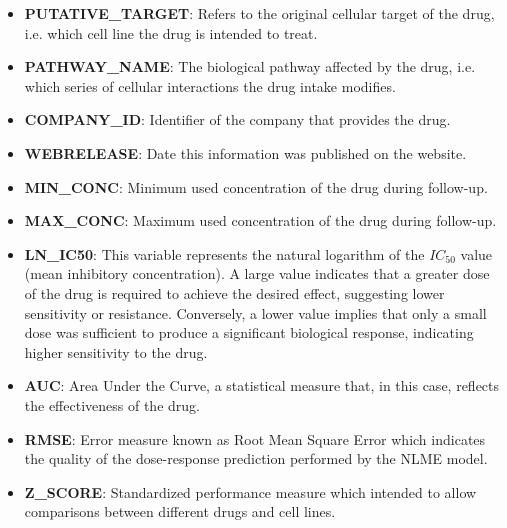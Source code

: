 \begin{enumerate}
\begin{itemize}
        \item \textbf{PUTATIVE\_TARGET}: Refers to the original cellular target of the drug, i.e. which cell line the drug is intended to treat.
        \item \textbf{PATHWAY\_NAME}: The biological pathway affected by the drug, i.e. which series of cellular interactions the drug intake modifies.
        \item \textbf{COMPANY\_ID}: Identifier of the company that provides the drug.
        \item \textbf{WEBRELEASE}: Date this information was published on the website.
        \item \textbf{MIN\_CONC}: Minimum used concentration of the drug during follow-up.
        \item \textbf{MAX\_CONC}: Maximum used concentration of the drug during follow-up.
        \item \textbf{LN\_IC50}: This variable represents the natural logarithm of the $IC_{50}$ value (mean inhibitory concentration). A large value indicates that a greater dose of the drug is required to achieve the desired effect, suggesting lower sensitivity or resistance. Conversely, a lower value implies that only a small dose was sufficient to produce a significant biological response, indicating higher sensitivity to the drug.
        \item \textbf{AUC}: Area Under the Curve, a statistical measure that, in this case, reflects the effectiveness of the drug.
        \item \textbf{RMSE}: Error measure known as Root Mean Square Error which indicates the quality of the dose-response prediction performed by the NLME model.
        \item \textbf{Z\_SCORE}: Standardized performance measure which intended to allow comparisons between different drugs and cell lines.
      \end{itemize}


\end{enumerate}
